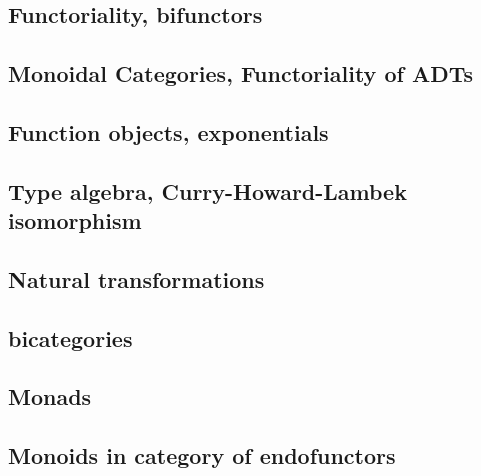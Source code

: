 \documentclass[12pt]{article}
\begin{document}
\subsection{Functoriality, bifunctors }
\subsection{Monoidal Categories, Functoriality of ADTs }
\subsection{Function objects, exponentials }
\subsection{Type algebra, Curry-Howard-Lambek isomorphism }
\subsection{Natural transformations}
\subsection{bicategories}
\subsection{Monads}
\subsection{Monoids in category of endofunctors}
\end{document}
